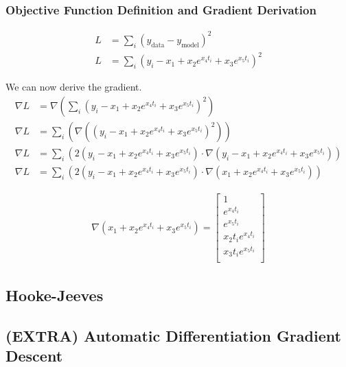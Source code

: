 \documentclass{article}
\begin{document}
    \subsubsection{Objective Function Definition and Gradient Derivation}

    \begin{align}
    L &= \sum_i (y_{\text{data}} - y_{\text{model}})^2 \\
    L &= \sum_i (y_{i} - x_1 + x_2 e ^ {x_4 t_i} + x_3 e ^{x_5 t_i})^2
    \end{align}

    We can now derive the gradient.
    \begin{align}
    \nabla L &= \nabla \left( \sum_i (y_{i} - x_1 + x_2 e ^ {x_4 t_i} + x_3 e ^{x_5 t_i})^2 \right) \\
    \nabla L &= \sum_i \left( \nabla \left( (y_{i} - x_1 + x_2 e ^ {x_4 t_i} + x_3 e ^{x_5 t_i})^2 \right) \right) \\
    \nabla L &= \sum_i \left( 2(y_{i} - x_1 + x_2 e ^ {x_4 t_i} + x_3 e ^{x_5 t_i}) \cdot \nabla (y_{i} - x_1 + x_2 e ^ {x_4 t_i} + x_3 e ^{x_5 t_i}) \right) \\
    \nabla L &= \sum_i \left( 2(y_{i} - x_1 + x_2 e ^ {x_4 t_i} + x_3 e ^{x_5 t_i}) \cdot \nabla (x_1 + x_2 e ^ {x_4 t_i} + x_3 e ^{x_5 t_i}) \right)
    \end{align}

    \begin{align}
        \nabla (x_1 + x_2 e ^ {x_4 t_i} + x_3 e ^{x_5 t_i}) = 
            \begin{bmatrix}
                1 \\
                e ^ {x_4 t_i} \\
                e ^ {x_5 t_i} \\
                x_2 t_i e ^ {x_4 t_i} \\
                x_3 t_i e ^{x_5 t_i} \\
            \end{bmatrix}
    \end{align}

    \subsection{Hooke-Jeeves}

    \subsection{(EXTRA) Automatic Differentiation Gradient Descent}
\end{document}
